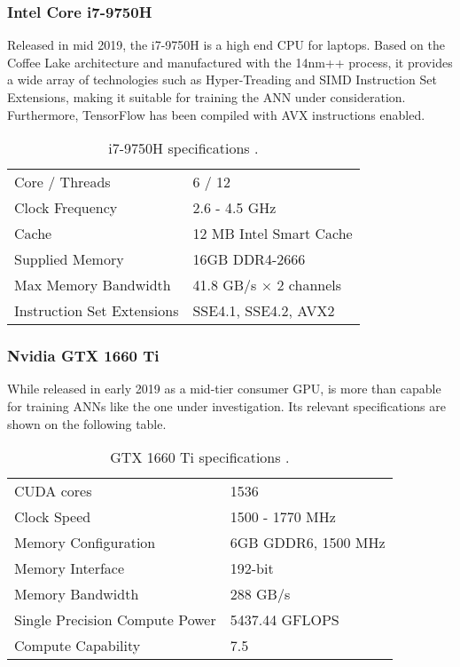 \subsubsection{Intel Core i7-9750H}
Released in mid 2019, the i7-9750H is a high end CPU for laptops. Based on the Coffee Lake architecture and manufactured with the 14nm++ process, it provides a wide array of technologies such as Hyper-Treading and SIMD Instruction Set Extensions, making it suitable for training the ANN under consideration. Furthermore, TensorFlow has been compiled with AVX instructions enabled. %
\begin{table}[H]
    \center
    \begin{tabular}
        { l | l }
        Core / Threads & 6 / 12\\
        Clock Frequency & 2.6 - 4.5 GHz\\
        Cache & 12 MB Intel Smart Cache\\
        Supplied Memory & 16GB DDR4-2666\\
        Max Memory Bandwidth & 41.8 GB/s $\times$ 2 channels\\
        Instruction Set Extensions & SSE4.1, SSE4.2, AVX2\\
    \end{tabular}
    \caption[i7-9750H specifications]{i7-9750H specifications \cite{i7-9750H}.}
    \label{table: i7-9750H}
\end{table}

\subsubsection{Nvidia GTX 1660 Ti}
While released in early 2019 as a mid-tier consumer GPU, is more than capable for training ANNs like the one under investigation. Its relevant specifications are shown on the following table. %
\begin{table}[H]
    \center
    \begin{tabular}
        { l | l }
        CUDA cores & 1536\\
        Clock Speed & 1500 - 1770 MHz\\
        Memory Configuration & 6GB GDDR6, 1500 MHz\\
        Memory Interface & 192-bit\\
        Memory Bandwidth & 288 GB/s\\
        Single Precision Compute Power & 5437.44 GFLOPS\\
        Compute Capability & 7.5\\
    \end{tabular}
    \caption[GTX 1660 Ti specifications]{GTX 1660 Ti specifications \cite{GTX1660Ti}.}
    \label{table: GTX1660Ti}
\end{table}

